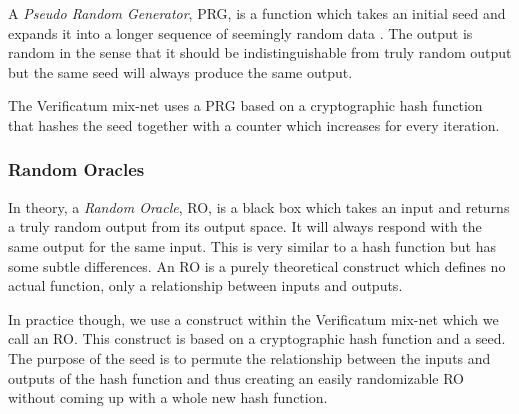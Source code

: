 A \emph{Pseudo Random Generator}, PRG, is a function which takes an
initial seed and expands it into a longer sequence of seemingly random
data \cite[p.~170]{hac}. The output is random in the sense that it should be
indistinguishable from truly random output but the same seed will
always produce the same output.

The Verificatum mix-net uses a PRG based on a cryptographic hash
function that hashes the seed together with a counter which increases
for every iteration.

\subsubsection{Random Oracles}

In theory, a \emph{Random Oracle}, RO, is a black box which takes an
input and returns a truly random output from its output space.\cite{oracle} It will
always respond with the same output for the same input. This is very
similar to a hash function but has some subtle differences. An RO is a
purely theoretical construct which defines no actual function, only a
relationship between inputs and outputs.

In practice though, we use a construct within the Verificatum mix-net
which we call an RO. This construct is based on a cryptographic hash
function and a seed. The purpose of the seed is to permute the
relationship between the inputs and outputs of the hash function and
thus creating an easily randomizable RO without coming up with a whole
new hash function.
